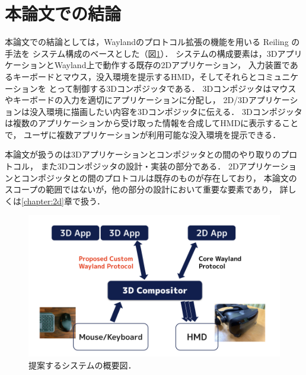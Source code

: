 \section{本論文での結論}
\label{section:overview:conclusion}

本論文での結論としては，Waylandのプロトコル拡張の機能を用いる Reiling の手法を
システム構成のベースとした（図\ref{fig:overview}）．
システムの構成要素は，3DアプリケーションとWayland上で動作する既存の2Dアプリケーション，
入力装置であるキーボードとマウス，没入環境を提示するHMD，そしてそれらとコミュニケーションを
とって制御する3Dコンポジッタである．
3Dコンポジッタはマウスやキーボードの入力を適切にアプリケーションに分配し，
2D/3Dアプリケーションは没入環境に描画したい内容を3Dコンポジッタに伝える．
3Dコンポジッタは複数のアプリケーションから受け取った情報を合成してHMDに表示することで，
ユーザに複数アプリケーションが利用可能な没入環境を提示できる．


本論文が扱うのは3Dアプリケーションとコンポジッタとの間のやり取りのプロトコル，
また3Dコンポジッタの設計・実装の部分である．
2Dアプリケーションとコンポジッタとの間のプロトコルは既存のものが存在しており，
本論文のスコープの範囲ではないが，他の部分の設計において重要な要素であり，
詳しくは\ref{chapter:2d}章で扱う．

\begin{figure}[htbp]
  \centering
  \includegraphics[keepaspectratio, width=\linewidth]{figures/overview.png}
  \caption{提案するシステムの概要図．}
  \label{fig:overview}
\end{figure}

